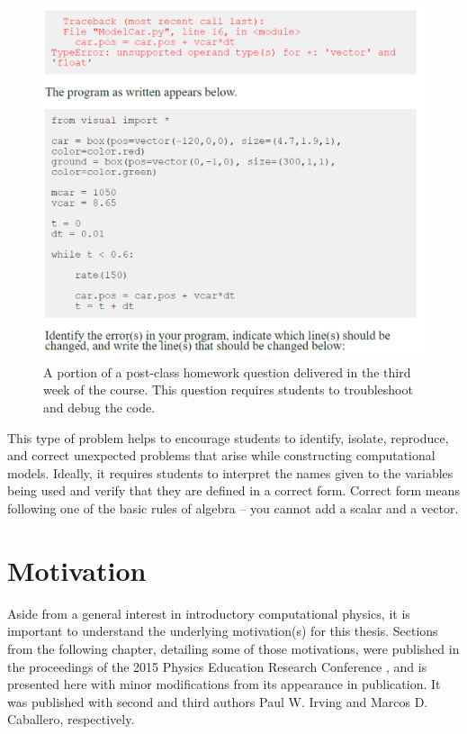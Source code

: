 \documentclass{msuphddissertation}
\begin{document}
\begin{doublespace}
\begin{figure}[ht]\centering
\includegraphics[scale=0.50]{images/CH3PostClassHomework.pdf}
\caption{A portion of a post-class homework question delivered in the third week of the course.  This question requires students to troubleshoot and debug the code.}\label{CH3:PostClassHomework}
\end{figure}

This type of problem helps to encourage students to identify, isolate, reproduce, and correct unexpected problems that arise while constructing computational models.  Ideally, it requires students to interpret the names given to the variables being used and verify that they are defined in a correct form.  Correct form means following one of the basic rules of algebra -- you cannot add a scalar and a vector.

%
%
%
%
%
%
%
%
%
%
%
%
%
%
%
%

\chapter{Motivation}\label{CH4:Motivation}

Aside from a general interest in introductory computational physics, it is important to understand the underlying motivation(s) for this thesis.  Sections from the following chapter, detailing some of those motivations, were published in the proceedings of the 2015 Physics Education Research Conference \cite{AAPT2016}, and is presented here with minor modifications from its appearance in publication. It was published with second and third authors Paul W. Irving and Marcos D. Caballero, respectively.


\end{doublespace}
\end{document}
